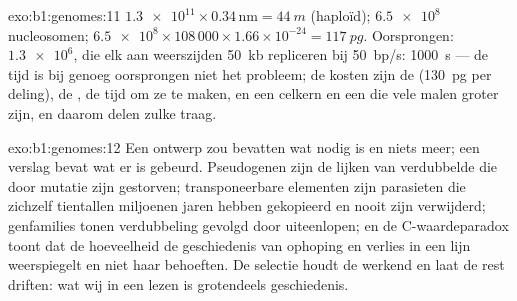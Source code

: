 \begin{solution}{exo:b1:genomes:11}
$\num{1.3e11}\times 0.34\,\mathrm{nm} = \qty{44}{m}$ (haploïd);
$\num{6.5e8}$ nucleosomen;  $\num{6.5e8}\times 108\,000\times
1.66\times 10^{-24} = \qty{117}{pg}$. Oorsprongen: $\num{1.3e6}$, die elk aan
weerszijden \qty{50}{kb} repliceren bij \qty{50}{bp/s}: \qty{1000}{s} --- de tijd is
bij genoeg oorsprongen niet het probleem; de kosten zijn de 
(\qty{130}{pg}  per deling), de , de tijd om ze te maken, en een celkern
en een  die vele malen groter zijn, en daarom delen zulke  traag.
\end{solution}

\begin{solution}{exo:b1:genomes:12}
Een ontwerp zou bevatten wat nodig is en niets meer; een verslag bevat wat er is
gebeurd. Pseudogenen zijn de lijken van verdubbelde  die door mutatie zijn
gestorven; transponeerbare elementen zijn parasieten die zichzelf tientallen
miljoenen jaren hebben gekopieerd en nooit zijn verwijderd; genfamilies tonen
verdubbeling gevolgd door uiteenlopen; en de C-waardeparadox toont dat de
hoeveelheid  de geschiedenis van ophoping en verlies in een lijn weerspiegelt en
niet haar behoeften. De selectie houdt de  werkend en laat de rest driften:
wat wij in een  lezen is grotendeels geschiedenis.
\end{solution}

